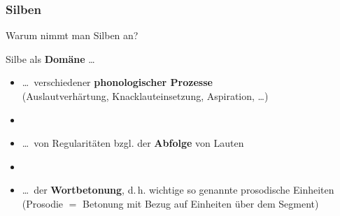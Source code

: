 \begin{frame}
\frametitle{Silben}

Warum nimmt man Silben an?

Silbe als \textbf{Domäne} \ldots

\begin{itemize}	
	\item \ldots\ verschiedener \textbf{phonologischer Prozesse}\\
               (\zB Auslautverhärtung, Knacklauteinsetzung, Aspiration, \ldots )
	
	\item[] 
	
	\item \ldots\ von Regularitäten bzgl. der \textbf{Abfolge} von Lauten
	
	\item[]
	
	\item \ldots\ der \textbf{Wortbetonung}, d.\,h. wichtige so genannte prosodische Einheiten (Prosodie $=$ Betonung mit Bezug auf Einheiten über dem Segment)
\end{itemize}

\end{frame}



